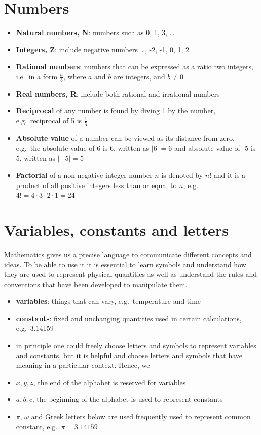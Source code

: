 \documentclass[
]{book}
\providecommand{\tightlist}{%
  \setlength{\itemsep}{0pt}\setlength{\parskip}{0pt}}
\theoremstyle{definition}
\theoremstyle{definition}
\theoremstyle{definition}
\theoremstyle{remark}
\begin{document}
\hypertarget{numbers}{%
\section{Numbers}\label{numbers}}

\begin{itemize}
\tightlist
\item
  \textbf{Natural numbers, N}: numbers such as 0, 1, 3, \ldots{}
\item
  \textbf{Integers, Z}: include negative numbers \ldots, -2, -1, 0, 1, 2
\item
  \textbf{Rational numbers}: numbers that can be expressed as a ratio two integers, i.e.~in a form \(\frac{a}{b}\), where \(a\) and \(b\) are integers, and \(b\neq0\)
\item
  \textbf{Real numbers, R}: include both rational and irrational numbers
\item
  \textbf{Reciprocal} of any number is found by diving 1 by the number, e.g.~reciprocal of 5 is \(\frac{1}{5}\)
\item
  \textbf{Absolute value} of a number can be viewed as its distance from zero, e.g.~the absolute value of 6 is 6, written as \(|6| = 6\) and absolute value of -5 is 5, written as \(|-5| = 5\)
\item
  \textbf{Factorial} of a non-negative integer number \(n\) is denoted by \(n!\) and it is a product of all positive integers less than or equal to \(n\), e.g.~\(4! = 4 \cdot 3\cdot 2 \cdot 1 = 24\)
\end{itemize}

\hypertarget{variables-constants-and-letters}{%
\section{Variables, constants and letters}\label{variables-constants-and-letters}}

Mathematics gives us a precise language to communicate different concepts and ideas. To be able to use it it is essential to learn symbols and understand how they are used to represent physical quantities as well as understand the rules and conventions that have been developed to manipulate them.

\begin{itemize}
\tightlist
\item
  \textbf{variables}: things that can vary, e.g.~temperature and time
\item
  \textbf{constants}: fixed and unchanging quantities used in certain calculations, e.g.~3.14159
\item
  in principle one could freely choose letters and symbols to represent variables and constants, but it is helpful and choose letters and symbols that have meaning in a particular context. Hence, we
\item
  \(x, y, z\), the end of the alphabet is reserved for variables
\item
  \(a, b, c\), the beginning of the alphabet is used to represent constants
\item
  \(\pi\), \(\omega\) and Greek letters below are used frequently used to represent common constant, e.g.~\(\pi = 3.14159\)
\end{itemize}
\end{document}
